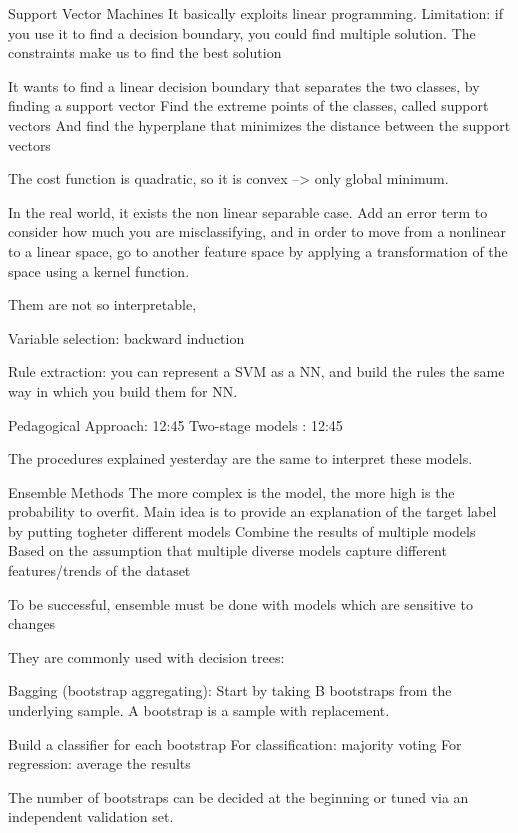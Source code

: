 Support Vector Machines
    It basically exploits linear programming.
    Limitation: if you use it to find a decision boundary, you could find multiple solution.
        The constraints make us to find the best solution 

    It wants to find a linear decision boundary that separates the two classes, by finding a support vector 
    Find the extreme points of the classes, called support vectors
    And find the hyperplane that minimizes the distance between the support vectors 

    The cost function is quadratic, so it is convex --> only global minimum.

    In the real world, it exists the non linear separable case.
    Add an error term to consider how much you are misclassifying, and in order
    to move from a nonlinear to a linear space, go to another feature space 
    by applying a transformation of the space using a kernel function.

    Them are not so interpretable, 
    
    Variable selection: backward induction 

    Rule extraction: you can represent a SVM as a NN, and build the rules
    the same way in which you build them for NN.

    Pedagogical Approach: 12:45
    Two-stage models : 12:45

    The procedures explained yesterday are the same to interpret these models.

Ensemble Methods 
    The more complex is the model, the more high is the probability to overfit.
    Main idea is to provide an explanation of the target label by putting togheter different models 
    Combine the results of multiple models 
    Based on the assumption that multiple diverse models capture different features/trends of the dataset

    To be successful, ensemble must be done with models which are sensitive to changes

    They are commonly used with decision trees:

    Bagging (bootstrap aggregating):
        Start by taking B bootstraps from the underlying sample.
        A bootstrap is a sample with replacement.

        Build a classifier for each bootstrap
        For classification: majority voting 
        For regression: average the results

        The number of bootstraps can be decided at the beginning or tuned via 
        an independent validation set.

